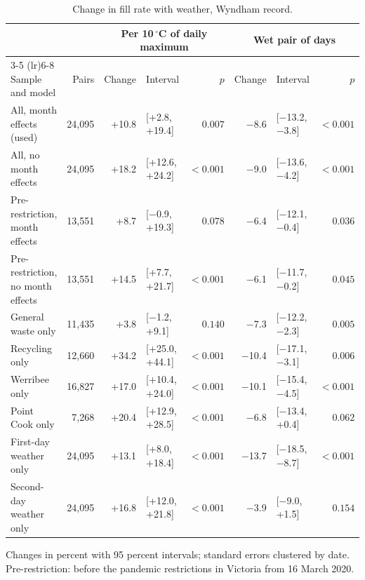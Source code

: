 \begin{table}[!htbp]
\caption{Change in fill rate with weather, Wyndham record.}
\label{tab:weatherdemand}
\centering
\footnotesize
\setlength{\tabcolsep}{3.5pt}
\begin{tabular}{lrrlrrlr}
\toprule
& & \multicolumn{3}{c}{Per 10\,$^\circ$C of daily maximum} & \multicolumn{3}{c}{Wet pair of days} \\
\cmidrule(lr){3-5} \cmidrule(lr){6-8}
Sample and model & Pairs & Change & Interval & $p$ & Change & Interval & $p$ \\
\midrule
All, month effects (used) & 24{,}095 & +10.8 & [+2.8, +19.4] & $0.007$ & \ensuremath{-}8.6 & [\ensuremath{-}13.2, \ensuremath{-}3.8] & $< 0.001$ \\
All, no month effects & 24{,}095 & +18.2 & [+12.6, +24.2] & $< 0.001$ & \ensuremath{-}9.0 & [\ensuremath{-}13.6, \ensuremath{-}4.2] & $< 0.001$ \\
Pre-restriction, month effects & 13{,}551 & +8.7 & [\ensuremath{-}0.9, +19.3] & $0.078$ & \ensuremath{-}6.4 & [\ensuremath{-}12.1, \ensuremath{-}0.4] & $0.036$ \\
Pre-restriction, no month effects & 13{,}551 & +14.5 & [+7.7, +21.7] & $< 0.001$ & \ensuremath{-}6.1 & [\ensuremath{-}11.7, \ensuremath{-}0.2] & $0.045$ \\
General waste only & 11{,}435 & +3.8 & [\ensuremath{-}1.2, +9.1] & $0.140$ & \ensuremath{-}7.3 & [\ensuremath{-}12.2, \ensuremath{-}2.3] & $0.005$ \\
Recycling only & 12{,}660 & +34.2 & [+25.0, +44.1] & $< 0.001$ & \ensuremath{-}10.4 & [\ensuremath{-}17.1, \ensuremath{-}3.1] & $0.006$ \\
Werribee only & 16{,}827 & +17.0 & [+10.4, +24.0] & $< 0.001$ & \ensuremath{-}10.1 & [\ensuremath{-}15.4, \ensuremath{-}4.5] & $< 0.001$ \\
Point Cook only & 7{,}268 & +20.4 & [+12.9, +28.5] & $< 0.001$ & \ensuremath{-}6.8 & [\ensuremath{-}13.4, +0.4] & $0.062$ \\
First-day weather only & 24{,}095 & +13.1 & [+8.0, +18.4] & $< 0.001$ & \ensuremath{-}13.7 & [\ensuremath{-}18.5, \ensuremath{-}8.7] & $< 0.001$ \\
Second-day weather only & 24{,}095 & +16.8 & [+12.0, +21.8] & $< 0.001$ & \ensuremath{-}3.9 & [\ensuremath{-}9.0, +1.5] & $0.154$ \\
\bottomrule
\end{tabular}
\par\smallskip\footnotesize Changes in percent with 95 percent intervals; standard errors clustered by date. Pre-restriction: before the pandemic restrictions in Victoria from 16 March 2020.
\end{table}
